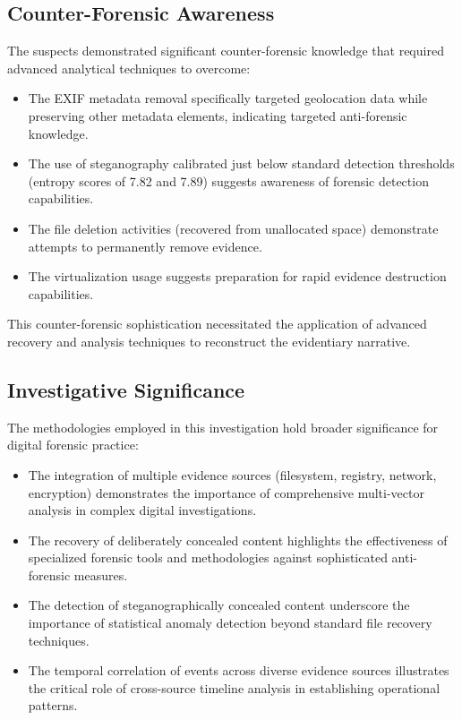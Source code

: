 \subsection{Counter-Forensic Awareness}
The suspects demonstrated significant counter-forensic knowledge that required advanced analytical techniques to overcome:

\begin{itemize}
    \item The EXIF metadata removal specifically targeted geolocation data while preserving other metadata elements, indicating targeted anti-forensic knowledge.
    
    \item The use of steganography calibrated just below standard detection thresholds (entropy scores of 7.82 and 7.89) suggests awareness of forensic detection capabilities.
    
    \item The file deletion activities (recovered from unallocated space) demonstrate attempts to permanently remove evidence.
    
    \item The virtualization usage suggests preparation for rapid evidence destruction capabilities.
\end{itemize}

This counter-forensic sophistication necessitated the application of advanced recovery and analysis techniques to reconstruct the evidentiary narrative.

\subsection{Investigative Significance}
The methodologies employed in this investigation hold broader significance for digital forensic practice:

\begin{itemize}
    \item The integration of multiple evidence sources (filesystem, registry, network, encryption) demonstrates the importance of comprehensive multi-vector analysis in complex digital investigations.
    
    \item The recovery of deliberately concealed content highlights the effectiveness of specialized forensic tools and methodologies against sophisticated anti-forensic measures.
    
    \item The detection of steganographically concealed content underscore the importance of statistical anomaly detection beyond standard file recovery techniques.
    
    \item The temporal correlation of events across diverse evidence sources illustrates the critical role of cross-source timeline analysis in establishing operational patterns.
\end{itemize}

